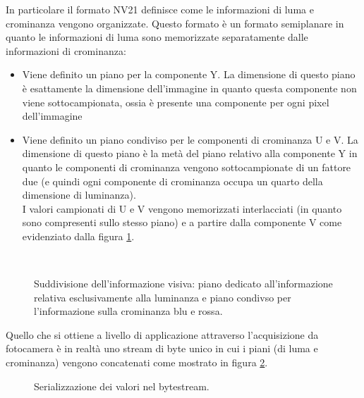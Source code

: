 \noindent In particolare il formato NV21 definisce come le informazioni di luma e crominanza vengono organizzate. Questo formato è un formato semiplanare in quanto le informazioni di luma sono memorizzate separatamente dalle informazioni di crominanza: 
\begin{itemize}
  \item Viene definito un piano per la componente Y. La dimensione di questo piano è esattamente la dimensione dell'immagine in quanto questa componente non viene sottocampionata, ossia è presente una componente per ogni pixel dell'immagine
  \item Viene definito un piano condiviso per le componenti di crominanza U e V. La dimensione di questo piano è la metà del piano relativo alla componente Y in quanto le componenti di crominanza vengono sottocampionate di un fattore due (e quindi ogni componente di crominanza occupa un quarto della dimensione di luminanza).\\
  I valori campionati di U e V vengono memorizzati interlacciati (in quanto sono compresenti sullo stesso piano) e a partire dalla componente V come evidenziato dalla figura \ref{YUVplanes}.\\
\end{itemize}
\begin{figure}[!ht]
\begin{center}
~
\end{center}
\caption{Suddivisione dell'informazione visiva: piano dedicato all'informazione relativa esclusivamente alla luminanza e piano condivso per l'informazione sulla crominanza blu e rossa.}
\label{YUVplanes}
\end{figure}

\noindent Quello che si ottiene a livello di applicazione attraverso l'acquisizione da fotocamera è in realtà uno stream di byte unico in cui i piani (di luma e crominanza) vengono concatenati come mostrato in figura \ref{YUVbytestream}.
\begin{figure}[!ht]
\begin{center}
\makebox[\linewidth]{\YUVbytestream}
\end{center}
\caption{Serializzazione dei valori nel bytestream.}
\label{YUVbytestream}
\end{figure}



